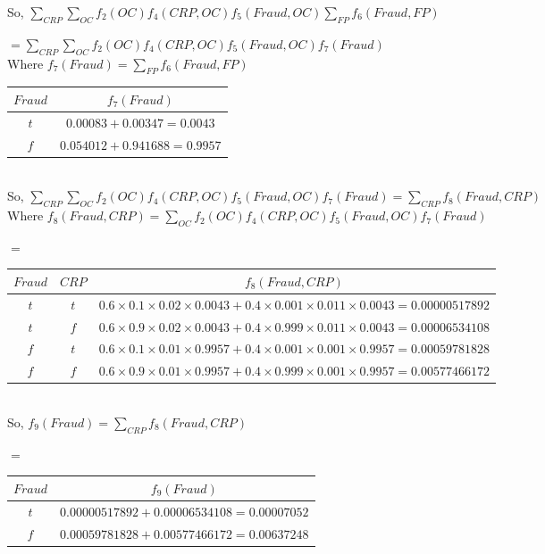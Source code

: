 \documentclass[10pt]{article}
\begin{document}
\begin{enumerate}
	So, $\sum_{CRP} \sum_{OC} f_2(OC) f_4(CRP, OC) f_5(Fraud, OC) \sum_{FP} f_6(Fraud, FP)$
	
	$= \sum_{CRP} \sum_{OC} f_2(OC) f_4(CRP, OC) f_5(Fraud, OC) f_7(Fraud)$\\
	
	Where $f_7(Fraud) = \sum_{FP} f_6(Fraud, FP)$
	
	\begin{tabular}{|c|c|}
	\hline
 	  $Fraud$ & $f_7(Fraud)$ \\
	\hline
	  $t$ & $ 0.00083 + 0.00347 = 0.0043$  \\
	\hline
	  $f$ & $ 0.054012 + 0.941688 = 0.9957$ \\
	\hline
	\end{tabular}\\
	
	So, $\sum_{CRP} \sum_{OC} f_2(OC) f_4(CRP, OC) f_5(Fraud, OC) f_7(Fraud) = \sum_{CRP} f_{8}(Fraud, CRP)$\\
	
	Where $f_8(Fraud, CRP) = \sum_{OC} f_2(OC) f_4(CRP, OC) f_5(Fraud, OC) f_7(Fraud)$
	
	$=$
	\begin{tabular}{|c|c|c|}
	\hline
 	  $Fraud$ & $CRP$ & $f_8(Fraud, CRP)$ \\
	\hline
	  $t$ & $t$ & $0.6 \times 0.1 \times 0.02 \times 0.0043 + 0.4 \times 0.001 \times 0.011 \times 0.0043 = 0.00000517892$  \\
	\hline
	 $t$ & $f$ & $0.6 \times 0.9 \times 0.02 \times 0.0043 + 0.4 \times 0.999 \times 0.011 \times 0.0043 = 0.00006534108$  \\
	\hline
	  $f$ & $t$ & $0.6 \times 0.1 \times 0.01 \times 0.9957 + 0.4 \times 0.001 \times 0.001 \times 0.9957 = 0.00059781828$ \\
	\hline
	$f$ & $f$ & $0.6 \times 0.9 \times 0.01 \times 0.9957 + 0.4 \times 0.999 \times 0.001 \times 0.9957 = 0.00577466172$  \\
	\hline
	\end{tabular}\\	
	
	So, $f_9(Fraud) = \sum_{CRP} f_{8}(Fraud, CRP)$
	
	$=$
	\begin{tabular}{|c|c|}
	\hline
 	  $Fraud$ & $f_9(Fraud)$ \\
	\hline
	  $t$ & $ 0.00000517892 + 0.00006534108 = 0.00007052$  \\
	\hline
	  $f$ & $ 0.00059781828 + 0.00577466172 = 0.00637248$ \\
	\hline
	\end{tabular}
	

\end{enumerate}
\end{document}
